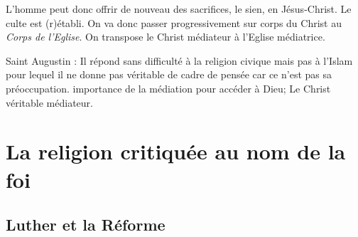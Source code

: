 L'homme peut donc offrir de nouveau des sacrifices, le sien, en Jésus-Christ. Le culte est (r)établi.  
On va donc passer progressivement sur corps du Christ au \textit{Corps de l'Eglise}. On transpose le Christ médiateur à l'Eglise médiatrice. 

\begin{Synthesis}

Saint Augustin : Il répond sans difficulté à la religion civique mais pas à l'Islam pour lequel il ne donne pas véritable de cadre de pensée car ce n'est pas sa préoccupation.
importance de la médiation pour accéder à Dieu; Le Christ véritable médiateur. 

\end{Synthesis}

 
 \section{La religion critiquée au nom de la foi}
 
 
\subsection{Luther et la Réforme}

